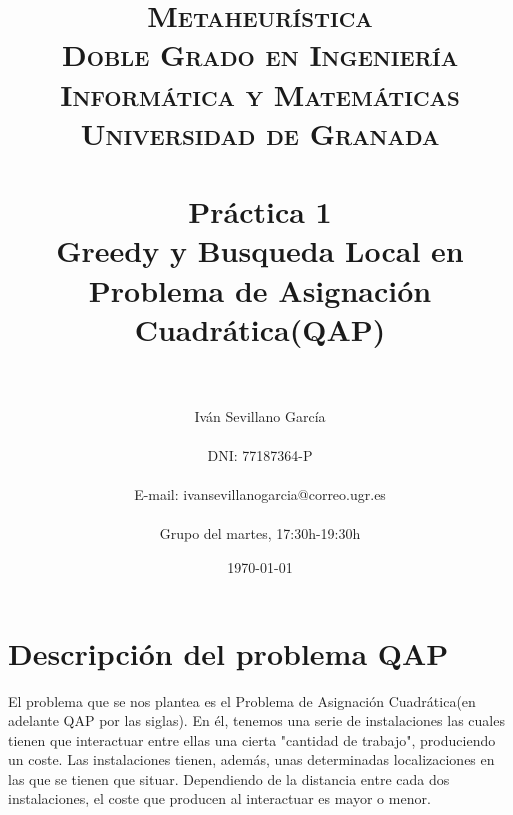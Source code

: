 


\title{	
\normalfont \normalsize 
\textsc{\textbf{Metaheurística} \\ Doble Grado en Ingeniería Informática y Matemáticas \\ Universidad de Granada} \\ [25pt] %
\horrule{0.5pt} \\[0.4cm] %
\Huge Práctica 1\\
\LARGE Greedy y Busqueda Local en Problema de Asignación Cuadrática(QAP)
 \\ %
\horrule{2pt} \\[0.5cm] %
}

\author{ Iván Sevillano García \\\\
	DNI: 77187364-P\\ \\
	E-mail: ivansevillanogarcia@correo.ugr.es\\\\
	Grupo del martes, 17:30h-19:30h
	} %

\date{\normalsize\today} %




\maketitle %

\newpage

\tableofcontents
\newpage

\section{Descripción del problema QAP}

El problema que se nos plantea es el Problema de Asignación Cuadrática(en adelante QAP por las siglas). En él, tenemos una serie de instalaciones las cuales tienen que interactuar entre ellas una cierta "cantidad de trabajo", produciendo un coste. Las instalaciones tienen, además, unas determinadas localizaciones en las que se tienen que situar. Dependiendo de la distancia entre cada dos instalaciones, el coste que producen al interactuar es mayor o menor.\\

